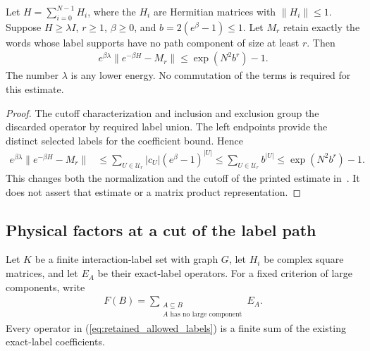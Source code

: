 \begin{theorem}
    \label{thm:normalized_cluster_label_tail}
    \leanok
    Let $H=\sum_{i=0}^{N-1}H_i$, where the $H_i$ are Hermitian matrices
    with $\|H_i\|\leq1$. Suppose $H\geq\lambda I$, $r\geq1$,
    $\beta\geq0$, and $b=2(e^\beta-1)\leq1$.
    Let $M_r$ retain exactly the words whose label supports have no
    path component of size at least $r$. Then
    \begin{align}
        e^{\beta\lambda}\|e^{-\beta H}-M_r\|
        \leq\exp(N^2b^r)-1.
        \label{eq:normalized_cluster_label_tail}
    \end{align}
    The number $\lambda$ is any lower energy. No commutation of the terms
    is required for this estimate.
\end{theorem}
\begin{proof}\leanok
    The cutoff characterization and inclusion and exclusion group the
    discarded operator by required label union.
    The left endpoints provide the distinct selected labels for the
    coefficient bound. Hence
    \begin{align}
        e^{\beta\lambda}\|e^{-\beta H}-M_r\|
         & \leq\sum_{U\in\mathcal U_r}|c_U|(e^\beta-1)^{|U|}
        \leq\sum_{U\in\mathcal U_r}b^{|U|}
        \leq\exp(N^2b^r)-1.
        \label{eq:normalized_cluster_label_tail_proof}
    \end{align}
    This changes both the normalization and the cutoff of the printed
    estimate in~\cite[lines 1270--1291 and 1935--1968]{Arad2016RigorousRG}.
    It does not assert that estimate or a matrix product representation.
\end{proof}


\subsection{Physical factors at a cut of the label path}

Let $K$ be a finite interaction-label set with graph $G$, let $H_i$ be
complex square matrices, and let $E_A$ be their exact-label operators.
For a fixed criterion of large components, write
\begin{align}
    F(B)=\sum_{\substack{A\subseteq B \\
            A\text{ has no large component}}}E_A.
    \label{eq:retained_allowed_labels}
\end{align}
Every operator in (\ref{eq:retained_allowed_labels}) is a finite sum of
the existing exact-label coefficients.

